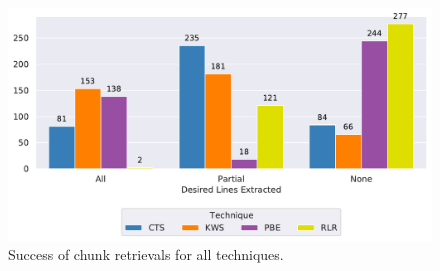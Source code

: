 \begin{figure}[!t]
		\centering
		\includegraphics[width=\columnwidth, clip]{img/big-study/success-partial-all.pdf}
		\caption{Success of chunk retrievals for all techniques.}
		\label{fig:success-partial-all}
\end{figure}

